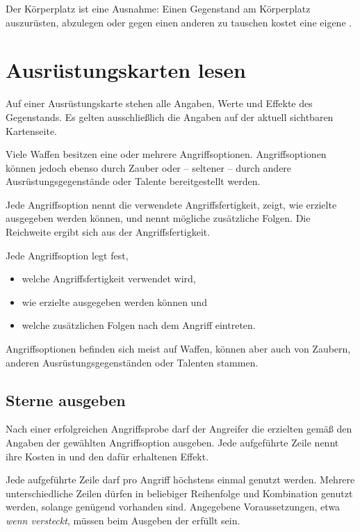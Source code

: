 Der Körperplatz ist eine Ausnahme: Einen Gegenstand am Körperplatz auszurüsten, abzulegen oder gegen einen anderen zu tauschen kostet eine eigene \standardAction.

\section{Ausrüstungskarten lesen}

Auf einer Ausrüstungskarte stehen alle Angaben, Werte und Effekte des Gegenstands. Es gelten ausschließlich die Angaben auf der aktuell sichtbaren Kartenseite.

Viele Waffen besitzen eine oder mehrere Angriffsoptionen. Angriffsoptionen können jedoch ebenso durch Zauber oder -- seltener -- durch andere Ausrüstungsgegenstände oder Talente bereitgestellt werden.

Jede Angriffsoption nennt die verwendete Angriffsfertigkeit, zeigt, wie erzielte \star{} ausgegeben werden können, und nennt mögliche zusätzliche Folgen. Die Reichweite ergibt sich aus der Angriffsfertigkeit.

\begin{kurzregel}[title=Angriffsoptionen]
Jede Angriffsoption legt fest,

\begin{itemize}
  \item welche Angriffsfertigkeit verwendet wird,
  \item wie erzielte \star{} ausgegeben werden können und
  \item welche zusätzlichen Folgen nach dem Angriff eintreten.
\end{itemize}

Angriffsoptionen befinden sich meist auf Waffen, können aber auch von Zaubern, anderen Ausrüstungsgegenständen oder Talenten stammen.
\end{kurzregel}

\subsection{Sterne ausgeben}

Nach einer erfolgreichen Angriffsprobe darf der Angreifer die erzielten \star{} gemäß den Angaben der gewählten Angriffsoption ausgeben. Jede aufgeführte Zeile nennt ihre Kosten in \star{} und den dafür erhaltenen Effekt.

Jede aufgeführte Zeile darf pro Angriff höchstens einmal genutzt werden. Mehrere unterschiedliche Zeilen dürfen in beliebiger Reihenfolge und Kombination genutzt werden, solange genügend \star{} vorhanden sind. Angegebene Voraussetzungen, etwa \emph{wenn versteckt}, müssen beim Ausgeben der \star{} erfüllt sein.

